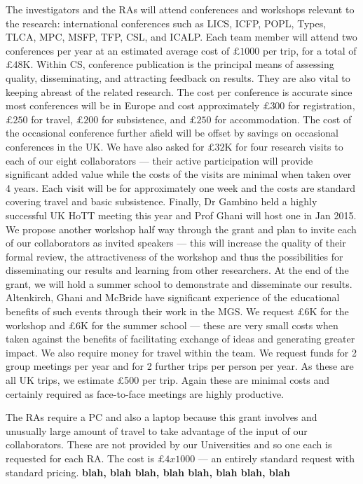 \documentclass[a4paper,11pt]{article}
\begin{document}
 The investigators and the RAs will
attend conferences and workshops relevant to the research:
international conferences such as LICS, ICFP, POPL, Types, TLCA, MPC,
MSFP, TFP, CSL, and ICALP. Each team member will attend two
conferences per year at an estimated average cost of $\pounds 1000$
per trip, for a total of $\pounds 48$K. Within CS, conference
publication is the principal means of assessing quality,
disseminating, and attracting feedback on results. They are also vital
to keeping abreast of the related research. The cost per conference is
accurate since most conferences will be in Europe and cost
approximately $\pounds 300$ for registration, $\pounds 250$ for
travel, $\pounds 200$ for subsistence, and $\pounds 250$ for
accommodation. The cost of the occasional conference further afield
will be offset by savings on occasional conferences in the UK. We have
also asked for $\pounds 32$K for four research visits to each of our
eight collaborators --- their active participation will provide
significant added value while the costs of the visits are minimal when
taken over 4 years. Each visit will be for approximately one week and
the costs are standard covering travel and basic subsistence. Finally,
Dr Gambino held a highly successful UK HoTT meeting this year and Prof
Ghani will host one in Jan 2015. We propose another
workshop half way through the grant and plan to invite each of our
collaborators as invited speakers --- this will increase the quality
of their formal review, the
attractiveness of the workshop and thus the possibilities for
disseminating our results and learning from other researchers. At the
end of the grant, we will hold a summer school to demonstrate and
disseminate our results. Altenkirch, Ghani and McBride have
significant experience of the educational benefits of such 
events through their work in the MGS. We request \pounds 6K for
the workshop and \pounds 6K for the summer school --- these
are very small costs when taken against the benefits of 
facilitating exchange of ideas and generating greater
impact. We also require money for travel within the 
team. We request funds for 2 group meetings per year and for 2
further trips per person per year. As these are all UK trips, we
estimate \pounds 500 per trip. Again these are minimal costs and
certainly required as face-to-face meetings are highly productive.

\vspace{0.02in}

 The RAs require a PC and also a
laptop because this grant involves and unusually large amount of travel to take
advantage of the input of our collaborators. These are not provided by
our Universities and so one each is requested for each RA. The cost is
$\pounds 4x1000$ --- an entirely standard request with standard
pricing. {\bf blah, blah blah, blah blah, blah blah, blah}
\end{document}
